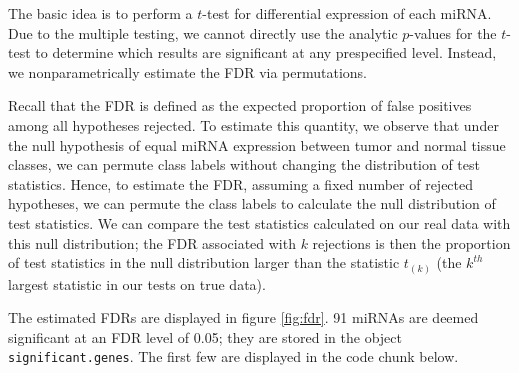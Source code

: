 \documentclass[12pt,english]{article}\usepackage{graphicx, color}
\numberwithin{equation}{section}
\numberwithin{figure}{section}
\theoremstyle{plain}
\theoremstyle{remark}
\begin{document}
The basic idea is to perform a $t$-test for differential
expression of each miRNA. Due to the multiple testing, we cannot
directly use the analytic $p$-values for the $t$-test to determine
which results are significant at any prespecified level. Instead, we
nonparametrically estimate the FDR via permutations.

Recall that the FDR is defined as the expected
proportion of false positives among all hypotheses rejected. To
estimate this quantity, we observe that under the null hypothesis of
equal miRNA expression between tumor and normal tissue classes, we can
permute class labels without changing the distribution of test
statistics. Hence, to estimate the FDR, assuming a
fixed number of rejected hypotheses, we can permute the class labels
to calculate the null distribution of test statistics. We can compare
the test statistics calculated on our real data with this null
distribution; the FDR associated with $k$ rejections
is then the proportion of test statistics in the null distribution
larger than the statistic $t_{\left(k\right)}$ (the $k^{th}$ largest
statistic in our tests on true data).

The estimated FDRs are displayed in figure
\ref{fig:fdr}. 91 miRNAs are deemed
significant at an FDR level of 0.05; they are stored in the object
\texttt{significant.genes}. The first few are displayed in the code
chunk below.
\end{document}
